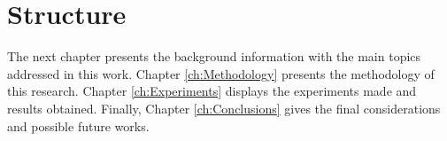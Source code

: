 \section{Structure}

The next chapter presents the background information with the main topics addressed in this work. Chapter \ref{ch:Methodology} presents the methodology of this research. Chapter \ref{ch:Experiments} displays the experiments made and results obtained. Finally, Chapter \ref{ch:Conclusions} gives the final considerations and possible future works.